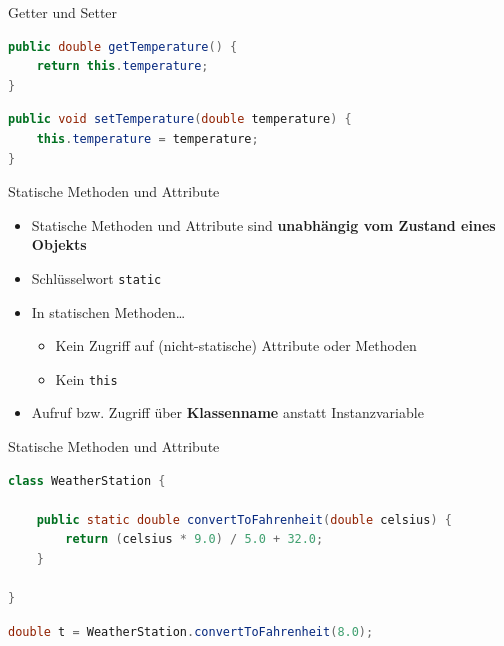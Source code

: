 \documentclass[18pt]{beamer}
\begin{document}
\begin{frame}[fragile]{Getter und Setter}
    \begin{exampleblock}{}
        \begin{lstlisting}[language=Java]
public double getTemperature() {
    return this.temperature;
}
        \end{lstlisting}
    \end{exampleblock}
    \begin{exampleblock}{}
        \begin{lstlisting}[language=Java]
public void setTemperature(double temperature) {
    this.temperature = temperature;
}
        \end{lstlisting}
    \end{exampleblock}
\end{frame}

\begin{frame}{Statische Methoden und Attribute}
    \begin{itemize}
        \item Statische Methoden und Attribute sind \textbf{unabhängig vom Zustand eines Objekts}
        \item Schlüsselwort \texttt{static}
        \item In statischen Methoden\dots
        \begin{itemize}
            \item Kein Zugriff auf (nicht-statische) Attribute oder Methoden
            \item Kein \texttt{this}
        \end{itemize}
        \item Aufruf bzw. Zugriff über \textbf{Klassenname} anstatt Instanzvariable
    \end{itemize}
\end{frame}

\begin{frame}[fragile]{Statische Methoden und Attribute}
    \begin{exampleblock}{}
        \begin{lstlisting}[language=Java,basicstyle=\scriptsize]
class WeatherStation {

    public static double convertToFahrenheit(double celsius) {
        return (celsius * 9.0) / 5.0 + 32.0;
    }

}
        \end{lstlisting}
    \end{exampleblock}
    \begin{lstlisting}[language=Java]
double t = WeatherStation.convertToFahrenheit(8.0);
    \end{lstlisting}
\end{frame}
\end{document}
